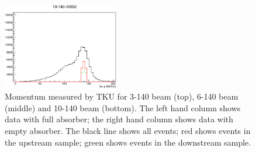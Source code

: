 \begin{figure}[!tbh]
    \includegraphics*[width=0.45\textwidth]{analysis_plots/plots_10-140-empty/tku_p.eps}
    \caption{Momentum measured by TKU for 3-140 beam (top), 6-140 beam (middle) and 10-140 beam (bottom).
    The left hand column shows data with full absorber; the right hand column shows data with empty absorber.
    The black line shows all events; red shows events in the upstream sample; green shows events in the downstream sample.
\label{fig:tku_mom}}
\end{figure}

